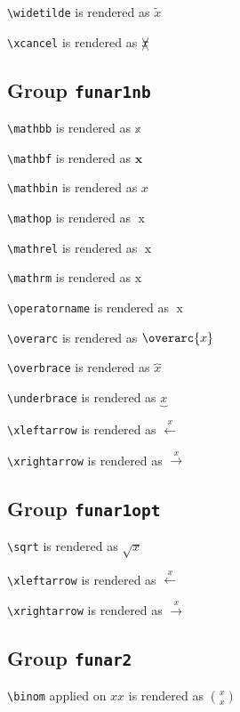 \texttt{\textbackslash widetilde} is rendered as $\widetilde{x}$

\texttt{\textbackslash xcancel} is rendered as $\xcancel{x}$

\subsection{ Group \texttt{fun\textunderscore ar1nb}}

\texttt{\textbackslash mathbb} is rendered as $\mathbb{x}$

\texttt{\textbackslash mathbf} is rendered as $\mathbf{x}$

\texttt{\textbackslash mathbin} is rendered as $\mathbin{x}$

\texttt{\textbackslash mathop} is rendered as $\mathop{x}$

\texttt{\textbackslash mathrel} is rendered as $\mathrel{x}$

\texttt{\textbackslash mathrm} is rendered as $\mathrm{x}$

\texttt{\textbackslash operatorname} is rendered as $\operatorname{x}$

\texttt{\textbackslash overarc} is rendered as $\overarc{x}$

\texttt{\textbackslash overbrace} is rendered as $\overbrace{x}$

\texttt{\textbackslash underbrace} is rendered as $\underbrace{x}$

\texttt{\textbackslash xleftarrow} is rendered as $\xleftarrow{x}$

\texttt{\textbackslash xrightarrow} is rendered as $\xrightarrow{x}$

\subsection{ Group \texttt{fun\textunderscore ar1opt}}



\texttt{\textbackslash sqrt} is rendered as $\sqrt{x}$

\texttt{\textbackslash xleftarrow} is rendered as $\xleftarrow{x}$

\texttt{\textbackslash xrightarrow} is rendered as $\xrightarrow{x}$

\subsection{ Group \texttt{fun\textunderscore ar2}}

\texttt{\textbackslash binom} applied on ${x}{x}$ is rendered as $\binom{x}{x}$

